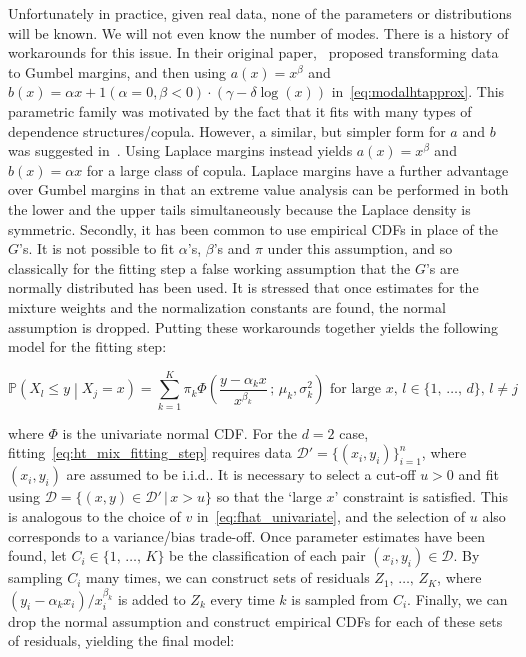 \documentclass[11pt,twoside,openany]{book}
\newcommand{\prob}{\mathbb{P}}
\newcommand{\D}{\mathcal{D}}
\numberwithin{Theorem}{chapter}
\numberwithin{Definition}{chapter}
\numberwithin{Lemma}{chapter}
\numberwithin{Algorithm}{chapter}
\numberwithin{equation}{chapter}
\begin{document}
Unfortunately in practice, given real data, none of the parameters or
distributions will be
known. We will not even know the number of modes. There is a history of workarounds for this issue.
In their original paper,~\cite{heffernan2004conditional}
proposed transforming data to Gumbel margins, and then using $a(x) = x^\beta$
and $b(x) = \alpha x + 1(\alpha=0,\beta < 0)\cdot(\gamma - \delta \log (x))$
in~\eqref{eq:modalhtapprox}. This parametric family was motivated by
the fact that it fits with many types of dependence structures/copula.
However, a similar, but simpler form for $a$ and $b$
was suggested in~\cite{keef2013estimation}.
Using Laplace margins instead yields $a(x) = x^\beta$ and $b(x) = \alpha x$
for a large class of copula.
Laplace margins have a further advantage over Gumbel margins in that
an extreme value analysis can be performed in both the lower and the upper tails
simultaneously because the Laplace density is symmetric.
Secondly, it has been common to use empirical CDFs in place of the $G$'s.
It is not possible to fit $\alpha$'s, $\beta$'s and $\pi$ under this
assumption, and so classically for the fitting step a false working assumption
that the $G$'s are normally distributed has been used. It is stressed that once
estimates for the mixture weights and the normalization constants are found,
the normal assumption is dropped. Putting these workarounds together yields the
following model for the fitting step:


\begin{equation}\label{eq:ht_mix_fitting_step}
  \prob\left(X_{l}\leq y\middle| X_{j} = x\right) = \sum_{k=1}^K \pi_k \Phi\left(\frac{y - \alpha_k x}{x^{\beta_k}}\,;\,\mu_k,\sigma_k^2\right) \text{ for large } x,\, l\in\{1,\,\ldots,\,d\},\,l\neq j
\end{equation}


where $\Phi$ is the univariate normal CDF. For the $d=2$ case,
fitting~\eqref{eq:ht_mix_fitting_step} requires data $\D' =
\{(x_i,y_i)\}_{i=1}^n$, where $(x_i , y_i)$ are assumed to be i.i.d.. It is
necessary to select a cut-off $u>0$ and fit using $\D = \{(x,y)\in \D' \,|\, x
> u\}$ so that the `large $x$' constraint is satisfied. This is analogous to
the choice of $v$ in~\eqref{eq:fhat_univariate}, and the selection of $u$ also
corresponds to a variance/bias trade-off. Once parameter estimates have been
found, let $C_i\in\{1,\,\ldots,\,K\}$ be the classification of each pair
$(x_i,y_i)\in\D$. By sampling $C_i$ many times, we can construct sets of
residuals $Z_1,\,\ldots,\,Z_K$, where $(y_i - \alpha_k x_i)/x_i^{\beta_k}$ is
added to $Z_k$ every time $k$ is sampled from $C_i$. Finally, we can drop the
normal assumption and construct empirical CDFs for each of these sets of
residuals, yielding the final model:
\end{document}
